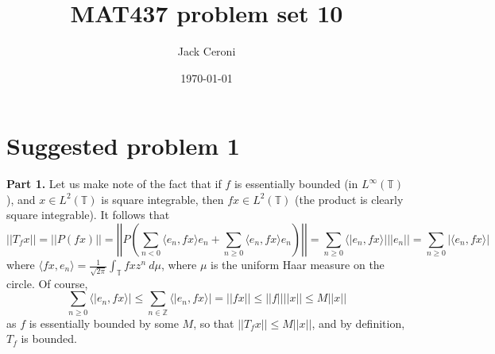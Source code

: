 \documentclass[aps,pra,showpacs,notitlepage,onecolumn,superscriptaddress,nofootinbib]{revtex4-1}
\theoremstyle{definition}
\begin{document}
\title{MAT437 problem set 10}
\author{Jack Ceroni}

\date{\today}

\maketitle

\section{Suggested problem 1}

\noindent \textbf{Part 1.} Let us make note of the fact that if $f$ is essentially bounded (in $L^{\infty}(\mathbb{T})$), and $x \in L^{2}(\mathbb{T})$ is square integrable, then $fx \in L^2(\mathbb{T})$ (the product
is clearly square integrable). It follows that
\begin{equation}
  ||T_f x|| = ||P(fx)|| = \left|\left|  P \left( \displaystyle\sum_{n < 0} \langle e_n, fx \rangle e_n + \displaystyle\sum_{n \geq 0} \langle e_n, fx \rangle e_n \right) \right| \right| =  \displaystyle\sum_{n \geq 0} \langle| e_n, fx \rangle| || e_n || = \displaystyle\sum_{n \geq 0} | \langle e_n, fx \rangle|
\end{equation}
where $\langle fx, e_n \rangle = \frac{1}{\sqrt{2\pi}} \int_{\mathbb{T}} fx z^n \ d\mu$, where $\mu$ is the uniform Haar measure on the circle. Of course,
\begin{equation}
  \displaystyle\sum_{n \geq 0} \langle| e_n, fx \rangle| \leq \displaystyle\sum_{n \in \mathbb{Z}} \langle| e_n, fx \rangle| = ||fx|| \leq ||f|| ||x|| \leq M ||x||
\end{equation}
as $f$ is essentially bounded by some $M$, so that $||T_f x|| \leq M ||x||$, and by definition, $T_f$ is bounded.
\newline
\end{document}
